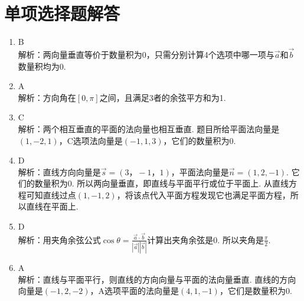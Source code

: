 \section{单项选择题解答}
\begin{enumerate}
	\item B\\
		解析：两向量垂直等价于数量积为0，只需分别计算4个选项中哪一项与$ \vec{a} $和$ \vec{b} $数量积均为0.
	\item A\\
		解析：方向角在$[0,\pi]$之间，且满足3者的余弦平方和为1.
	\item C\\
		解析：两个相互垂直的平面的法向量也相互垂直. 题目所给平面法向量是$ (1,-2,1) $，C选项法向量是$ (-1,1, 3) $，它们的数量积为0.
	\item D\\
		解析：直线方向向量是$\vec{s}=(3，-1，1)$，平面法向量是$ \vec{n}=(1,2,-1) $. 它们的数量积为0. 所以两向量垂直，即直线与平面平行或位于平面上. 从直线方程可知直线过点$ (1,-1,2) $，将该点代入平面方程发现它也满足平面方程，所以直线在平面上.
	\item D\\
		解析：用夹角余弦公式$ \cos{\theta}=\frac{\vec{a}\cdot\vec{b}}{|\vec{a}||\vec{b}|} $计算出夹角余弦是0. 所以夹角是$ \frac{\pi}{2} $.
	\item A\\
		解析：直线与平面平行，则直线的方向向量与平面的法向量垂直. 直线的方向向量是$ (-1,2,-2) $，A选项平面的法向量是$ (4,1,-1) $，它们是数量积为0.
\end{enumerate}
